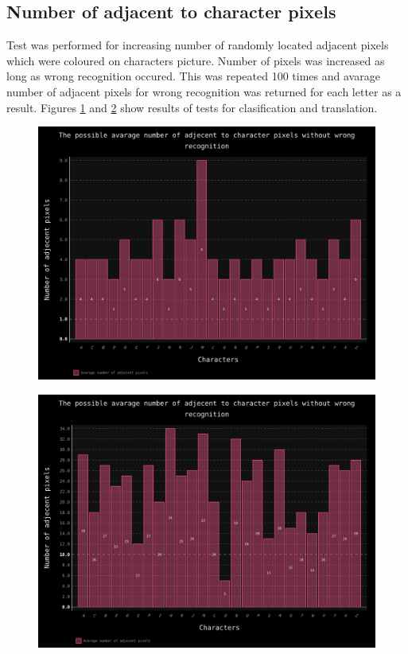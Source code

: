 \documentclass[a4paper]{article}
\begin{document}
\clearpage
\subsection{Number of adjacent to character pixels}
Test was performed for increasing number of randomly located adjacent pixels which were coloured on characters picture. Number of pixels was increased as long as wrong recognition occured. This was repeated 100 times and avarage number of adjacent pixels for wrong recognition was returned for each letter as a result. Figures \ref{adjacent_trans} and \ref{adjacent_clas} show results of tests for clasification and translation.
\begin{figure}[ht]
	\centering
	\includegraphics[scale=0.7,keepaspectratio=true]{Charts/AdjecentTestPlanResultsChart_NormalTester.png}	
	\caption{}
	\label{adjacent_trans}
\end{figure}

\begin{figure}[t]
	\centering
	\includegraphics[scale=0.7,keepaspectratio=true]{Charts/AdjecentTestPlanResultsChart_ClasifierTester.png}	
	\caption{}
	\label{adjacent_clas}
\end{figure}
\end{document}
